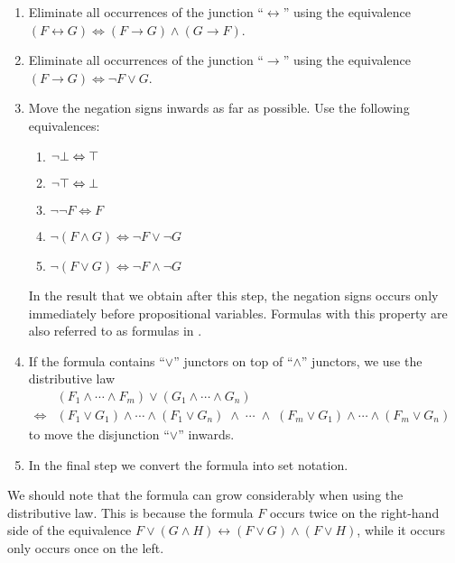 \begin{enumerate}
\item Eliminate all occurrences of the junction ``$\leftrightarrow$'' using the equivalence \\[0.2cm]
      \hspace*{1.3cm} 
      $(F \leftrightarrow G) \Leftrightarrow (F \rightarrow G) \wedge (G \rightarrow F)$.
\item Eliminate all occurrences of the junction ``$\rightarrow$'' using the equivalence \\[0.2cm]
      \hspace*{1.3cm} 
      $(F \rightarrow G) \Leftrightarrow \neg F \vee G$.
\item Move the negation signs inwards as far as possible.  Use the following equivalences:
      \begin{enumerate}
      \item $\neg \bot \Leftrightarrow \top$
      \item $\neg \top \Leftrightarrow \bot$
      \item $\neg \neg F \Leftrightarrow F$
      \item $\neg (F \wedge G) \Leftrightarrow \neg F \vee \neg G$ 
      \item $\neg (F \vee G) \Leftrightarrow \neg F \wedge \neg G$ 
      \end{enumerate}
      In the result that we obtain after this step, the negation signs
      occurs only immediately before propositional variables.  Formulas with this
      property are also referred to as formulas in .
\item If the formula contains ``$\vee$'' junctors on top of ``$\wedge$'' junctors, we use the distributive law \\[0.2cm]
      \hspace*{1.3cm} 
      $
      \begin{array}{cl}
                      & (F_1 \wedge \cdots \wedge F_m) \vee (G_1 \wedge \cdots \wedge G_n) \\[0.2cm]
      \Leftrightarrow & (F_1 \vee G_1) \wedge \cdots \wedge (F_1 \vee G_n) \;\wedge \;\cdots\; \wedge\;
                        (F_m \vee G_1) \wedge \cdots \wedge (F_m \vee G_n)
      \end{array}
      $
      \\[0.2cm]
      to move the disjunction ``$\vee$'' inwards.
\item In the final step we convert the formula into set notation.
\end{enumerate}
We should note that the formula can grow considerably when using the distributive law.
This is because the formula $F$ occurs twice on the right-hand side of the equivalence 
$F \vee (G \wedge H) \leftrightarrow (F \vee G) \wedge (F \vee H)$, while it occurs only occurs once on the left. 

